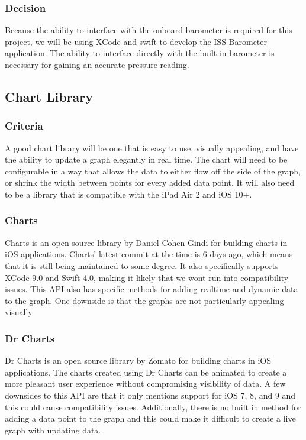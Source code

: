 \documentclass[onecolumn, draftclsnofoot,10pt, compsoc]{IEEEtran}
\begin{document}
\subsubsection{Decision}
Because the ability to interface with the onboard barometer is required for this project, we will be using XCode and swift to develop the ISS Barometer application.
The ability to interface directly with the built in barometer is necessary for gaining an accurate pressure reading.

\subsection{Chart Library}
\subsubsection{Criteria}
A good chart library will be one that is easy to use, visually appealing, and have the ability to update a graph elegantly in real time.
The chart will need to be configurable in a way that allows the data to either flow off the side of the graph, or shrink the width between points for every added data point.
It will also need to be a library that is compatible with the iPad Air 2 and iOS 10+.

\subsubsection{Charts}
Charts is an open source library by Daniel Cohen Gindi for building charts in iOS applications.
Charts' latest commit at the time is 6 days ago, which means that it is still being maintained to some degree.
It also specifically supports XCode 9.0 and Swift 4.0, making it likely that we wont run into compatibility issues.
This API also has specific methods for adding realtime and dynamic data to the graph.
One downside is that the graphs are not particularly appealing visually

\subsubsection{Dr Charts}
Dr Charts is an open source library by Zomato for building charts in iOS applications.
The charts created using Dr Charts can be animated to create a more pleasant user experience without compromising visibility of data.
A few downsides to this API are that it only mentions support for iOS 7, 8, and 9 and this could cause compatibility issues.
Additionally, there is no built in method for adding a data point to the graph and this could make it difficult to create a live graph with updating data.
\end{document}
